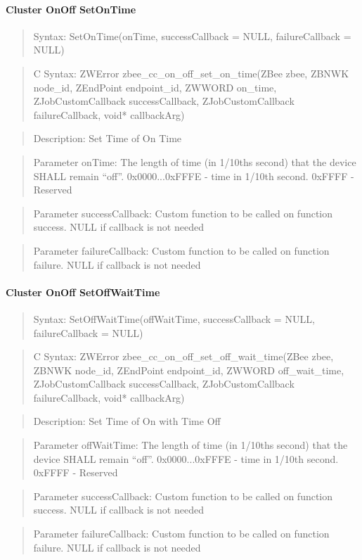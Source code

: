 \paragraph{Cluster OnOff SetOnTime}
\begin{quote}Syntax: SetOnTime(onTime, successCallback = NULL, failureCallback = NULL)\end{quote}
\begin{quote}C Syntax: ZWError zbee\_cc\_on\_off\_set\_on\_time(ZBee zbee, ZBNWK node\_id, ZEndPoint endpoint\_id, ZWWORD on\_time, ZJobCustomCallback successCallback, ZJobCustomCallback failureCallback, void* callbackArg)\end{quote}
\begin{quote}Description: Set Time of On Time\end{quote}
\begin{quote}Parameter onTime: The length of time (in 1/10ths second) that the device SHALL remain “off”. 0x0000...0xFFFE - time in 1/10th second. 0xFFFF          - Reserved\end{quote}
\begin{quote}Parameter successCallback: Custom function to be called on function success. NULL if callback is not needed\end{quote}
\begin{quote}Parameter failureCallback: Custom function to be called on function failure. NULL if callback is not needed\end{quote}


\paragraph{Cluster OnOff SetOffWaitTime}
\begin{quote}Syntax: SetOffWaitTime(offWaitTime, successCallback = NULL, failureCallback = NULL)\end{quote}
\begin{quote}C Syntax: ZWError zbee\_cc\_on\_off\_set\_off\_wait\_time(ZBee zbee, ZBNWK node\_id, ZEndPoint endpoint\_id, ZWWORD off\_wait\_time, ZJobCustomCallback successCallback, ZJobCustomCallback failureCallback, void* callbackArg)\end{quote}
\begin{quote}Description: Set Time of On with Time Off\end{quote}
\begin{quote}Parameter offWaitTime: The length of time (in 1/10ths second) that the device SHALL remain “off”. 0x0000...0xFFFE - time in 1/10th second. 0xFFFF          - Reserved\end{quote}
\begin{quote}Parameter successCallback: Custom function to be called on function success. NULL if callback is not needed\end{quote}
\begin{quote}Parameter failureCallback: Custom function to be called on function failure. NULL if callback is not needed\end{quote}



